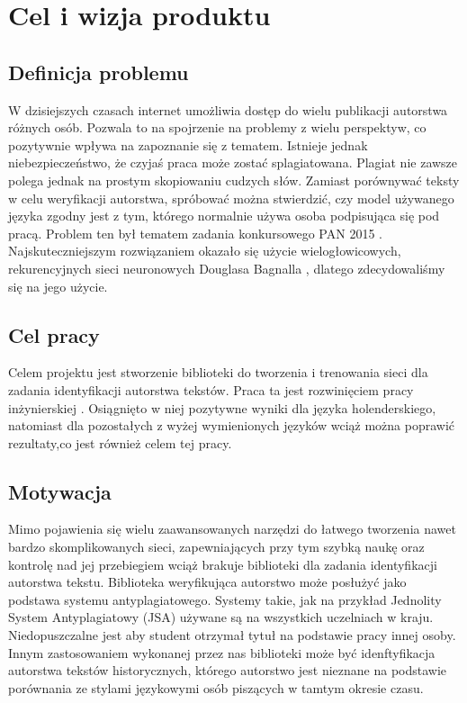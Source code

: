 \newpage
\section{Cel i wizja produktu}

\subsection{Definicja problemu}
W dzisiejszych czasach internet umożliwia dostęp do wielu publikacji autorstwa różnych osób.
Pozwala to na spojrzenie na problemy z wielu perspektyw, co pozytywnie wpływa na zapoznanie się z tematem.
Istnieje jednak niebezpieczeństwo, że czyjaś praca może zostać splagiatowana. Plagiat nie zawsze polega jednak
na prostym skopiowaniu cudzych słów. Zamiast porównywać teksty w celu weryfikacji autorstwa, 
spróbować można stwierdzić, czy model używanego języka zgodny jest z tym, którego normalnie używa osoba
podpisująca się pod pracą. Problem ten był tematem zadania konkursowego PAN 2015 \cite{pan}.
Najskuteczniejszym rozwiązaniem okazało się użycie wielogłowicowych, rekurencyjnych sieci 
neuronowych Douglasa Bagnalla \cite{bagnall}, dlatego zdecydowaliśmy się na jego użycie.

 
\subsection{Cel pracy}
Celem projektu jest stworzenie biblioteki do tworzenia i trenowania sieci dla zadania 
identyfikacji autorstwa tekstów. Praca ta jest rozwinięciem pracy inżynierskiej \cite{radzio}. Osiągnięto w 
niej pozytywne wyniki dla języka holenderskiego, natomiast dla pozostałych z wyżej wymienionych języków 
wciąż można poprawić rezultaty,co jest również celem tej pracy.


\subsection{Motywacja}
Mimo pojawienia się wielu zaawansowanych narzędzi do łatwego tworzenia nawet bardzo skomplikowanych sieci, 
zapewniających przy tym szybką naukę oraz kontrolę nad jej przebiegiem wciąż brakuje biblioteki dla zadania identyfikacji autorstwa 
tekstu.
Biblioteka weryfikująca autorstwo może posłużyć jako podstawa systemu antyplagiatowego. Systemy takie, 
jak na przykład Jednolity System Antyplagiatowy (JSA) używane są na wszystkich uczelniach w kraju.
Niedopuszczalne jest aby student otrzymał tytuł na podstawie pracy innej osoby. Innym zastosowaniem
wykonanej przez nas biblioteki może być idenftyfikacja autorstwa tekstów historycznych, którego autorstwo jest
nieznane na podstawie porównania ze stylami językowymi osób piszących w tamtym okresie czasu.

